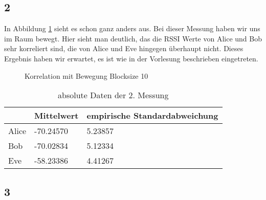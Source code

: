 \documentclass[12pt,a4paper]{article}
\begin{document}
\subsection*{2}
In Abbildung \ref{fig:2} sieht es schon ganz anders aus. Bei dieser Messung haben wir uns im Raum bewegt. Hier sieht man deutlich, das die RSSI Werte von Alice und Bob sehr korreliert sind, die von Alice und Eve hingegen überhaupt nicht. Dieses Ergebnis haben wir erwartet, es ist wie in der Vorlesung beschrieben eingetreten.
\begin{figure}[H]
\centering
{} \qquad
{}
\caption{Korrelation mit Bewegung Blocksize 10}
\label{fig:2}
\end{figure}
\begin{table}[H]
\centering
\begin{tabular}{l|l|l}
& Mittelwert & empirische Standardabweichung \\
\hline
Alice & -70.24570 & 5.23857 \\
\hline
Bob & -70.02834 & 5.12334 \\
\hline
Eve & -58.23386 & 4.41267 \\
\end{tabular}
\caption{absolute Daten der 2. Messung}
\end{table}
\subsection*{3}
\end{document}

